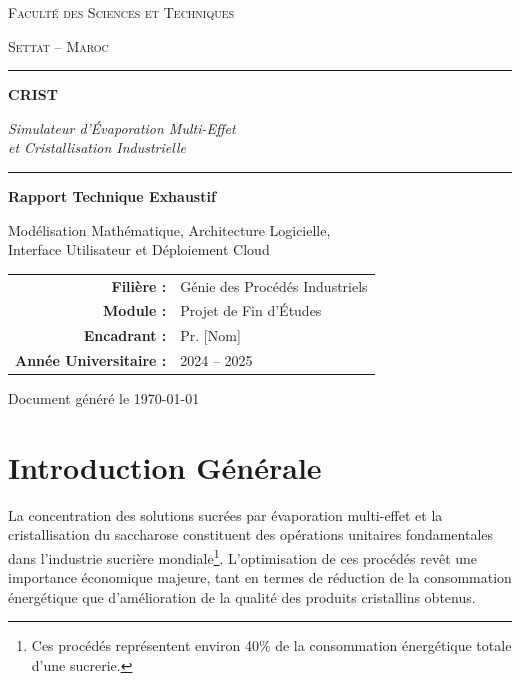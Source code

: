 \documentclass[12pt,a4paper,twoside]{article}
\begin{document}
\begin{titlepage}
\centering
\vspace*{1.5cm}
{\scshape\LARGE Faculté des Sciences et Techniques\par}
{\scshape\large Settat -- Maroc\par}
\vspace{1.5cm}
\rule{\textwidth}{2pt}\par
\vspace{0.6cm}
{\Huge\bfseries\color{cristblue} CRIST\par}
\vspace{0.4cm}
{\Large\itshape Simulateur d'Évaporation Multi-Effet\\et Cristallisation Industrielle\par}
\vspace{0.4cm}
\rule{\textwidth}{2pt}\par
\vspace{1.5cm}
{\Large\bfseries Rapport Technique Exhaustif\par}
\vspace{0.3cm}
{\large Modélisation Mathématique, Architecture Logicielle,\\Interface Utilisateur et Déploiement Cloud\par}
\vfill
{\large
\begin{tabular}{rl}
\textbf{Filière :} & Génie des Procédés Industriels \\
\textbf{Module :} & Projet de Fin d'Études \\
\textbf{Encadrant :} & Pr. [Nom] \\
\textbf{Année Universitaire :} & 2024 -- 2025 \\
\end{tabular}
}
\vspace{1.5cm}
{\small Document généré le \today}
\end{titlepage}

\tableofcontents
\newpage

\section{Introduction Générale}

\lettrine[lines=3, findent=3pt, nindent=0pt]{L}{}a concentration des solutions sucrées par évaporation multi-effet et la cristallisation du saccharose constituent des opérations unitaires fondamentales dans l'industrie sucrière mondiale\footnote{Ces procédés représentent environ 40\% de la consommation énergétique totale d'une sucrerie.}. L'optimisation de ces procédés revêt une importance économique majeure, tant en termes de réduction de la consommation énergétique que d'amélioration de la qualité des produits cristallins obtenus.
\end{document}
